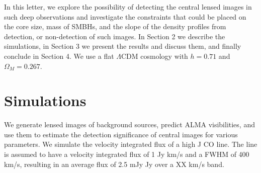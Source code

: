 \documentclass[chicago]{emulateapj}
\begin{document}
 In this letter, we explore the possibility of detecting the central lensed images in such deep observations and investigate the constraints that could be placed on the core size, mass of SMBHs, and the slope of the density profiles from detection, or non-detection of such images. In Section 2 we describe the simulations, in Section 3 we present the results and discuss them, and finally conclude in Section 4. We use a flat $\Lambda$CDM cosmology with $h=0.71$ and $\Omega_M=0.267$.
 


\section{Simulations}
We generate lensed images of background sources, predict ALMA visibilities, and use them to estimate the detection significance of central images for various parameters. We simulate the velocity integrated flux of a high J CO line. The line is assumed to have a velocity integrated flux of 1 Jy km/s and a FWHM of 400 km/s, resulting in an average flux of 2.5 mJy Jy over a XX km/s band. 
\end{document}
